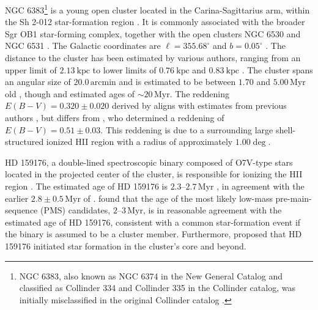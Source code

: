 \documentclass{aa}
\begin{document}
NGC 6383\footnote{NGC 6383, also known as NGC 6374 in the New General Catalog \citep{2008hsf2.book..497R} and classified as Collinder 334 and Collinder 335 in the Collinder catalog, was initially misclassified in the original Collinder catalog \citep{1931AnLun...2....1C}.} is a young open cluster located in the Carina-Sagittarius arm, within the Sh 2-012 star-formation region \citep{1959ApJS....4..257S}. It is commonly associated with the broader Sgr OB1 star-forming complex, together with the open clusters NGC 6530 and NGC 6531 \citep{2008hsf2.book..497R}. The Galactic coordinates are $\ell = 355.68^{\circ}$ and $b = 0.05^{\circ}$ \citep{2017A&A...600A.106C}. The distance to the cluster has been estimated by various authors, ranging from an upper limit of $2.13~\mathrm{kpc}$ \citep{1930LicOB..14..154T} to lower limits of $0.76~\mathrm{kpc}$ \citep{1949ApJ...110..117S} and $0.83~\mathrm{kpc}$ \citep{2018AA...610A..30A}. The cluster spans an angular size of $20.0\,\mathrm{arcmin}$ \citep{2013A&A...560A..76M} and is estimated to be between $1.70$ and $5.00\,\mathrm{Myr}$ old \citep{1978MNRAS.182..607F,1989MNRAS.236..263P,2005AA...438.1163K,2007AA...462..157P}, though \citet{1968ArA.....5....1L} and \citet{1991MNRAS.249...76B} estimated ages of $\sim20\,\mathrm{Myr}$. The reddening $E(B-V) = 0.320 \pm 0.020$ derived by \citet{2008hsf2.book..497R} aligns with estimates from previous authors \citep{1971AAS....4..241B,1978MNRAS.182..607F,1978MNRAS.184..661L,1985AA...151..391T,1989MNRAS.236..263P,1994RMxAA..29..141F,2007AA...462..157P}, but differs from \citet{2018AA...610A..30A}, who determined a reddening of $E(B-V) = 0.51 \pm 0.03$. This reddening is due to a surrounding large shell-structured ionized HII region with a radius of approximately $1.00\deg$.

HD 159176, a double-lined spectroscopic binary composed of O7V-type stars located in the projected center of the cluster, is responsible for ionizing the HII region \citep{2016ApJ...832..211P}. The estimated age of HD 159176 is $2.3$--$2.7\,\mathrm{Myr}$ \citep{2010AA...511A..25R}, in agreement with the earlier $2.8\pm0.5\,\mathrm{Myr}$ of \citet{1978MNRAS.182..607F}. \citet{2010AA...511A..25R} found that the age of the most likely low-mass pre-main-sequence (PMS) candidates, $2$--$3\,\mathrm{Myr}$, is in reasonable agreement with the estimated age of HD 159176, consistent with a common star-formation event if the binary is assumed to be a cluster member. Furthermore, \citet{1978MNRAS.182..607F} proposed that HD 159176 initiated star formation in the cluster's core and beyond.  %
\end{document}
